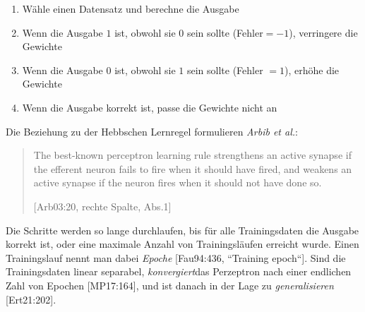 \begin{enumerate}
    \item Wähle einen Datensatz und berechne die Ausgabe
    \item Wenn die Ausgabe $1$ ist, obwohl sie $0$ sein sollte (Fehler\footnotemark[24] $=-1$), verringere die Gewichte
    \item Wenn die Ausgabe $0$ ist, obwohl sie $1$ sein sollte  (Fehler $=1$), erhöhe die Gewichte
    \item Wenn die Ausgabe korrekt ist, passe die Gewichte nicht an
\end{enumerate}

\noindent
Die Beziehung zu der Hebbschen Lernregel formulieren \textit{Arbib et al.}\footnotemark[25]:




\blockquote[{[Arb03:20, rechte Spalte, Abs.1]}]{
    The best-known perceptron learning rule strengthens an active synapse if the efferent neuron fails to fire when it should have fired, and weakens an active synapse if the neuron fires when it should not have done so.
}

\noindent
Die Schritte werden so lange durchlaufen, bis für alle Trainingsdaten die Ausgabe korrekt ist, oder eine maximale Anzahl von Trainingsläufen erreicht wurde. 
Einen Trainingslauf nennt man dabei \textit{Epoche} [Fau94:436, ``Training epoch``]. 
Sind die Trainingsdaten linear separabel, \textit{konvergiert}\footnotemark[26] das Perzeptron nach einer endlichen Zahl von Epochen [MP17:164]\footnotemark[27], und ist danach in der Lage zu \textit{generalisieren} [Ert21:202].\\


